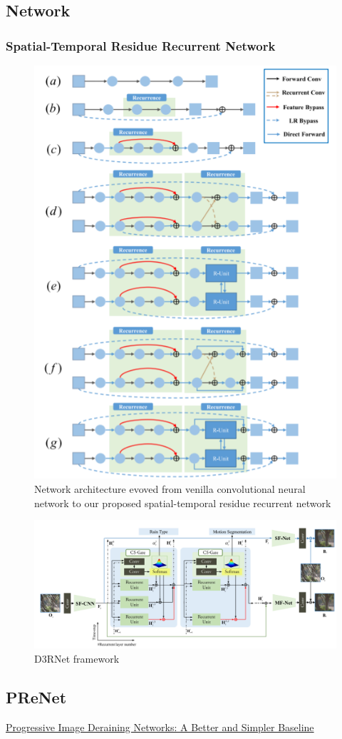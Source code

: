 \documentclass{article}
\begin{document}
\subsection{Network}
\subsubsection{Spatial-Temporal Residue Recurrent Network}
\begin{figure}[H]
\centering
\includegraphics[width=\linewidth]{D3RNET}
\caption{Network architecture evoved from venilla convolutional neural network to our proposed spatial-temporal residue recurrent network}
\end{figure}
\begin{figure}[H]
\centering
\includegraphics[width=\linewidth]{D3RNET2}
\caption{D3RNet framework}
\end{figure}
\subsection{PReNet}
\href{https://csdwren.github.io/papers/PReNet_cvpr_camera.pdf}{Progressive Image Deraining Networks: A Better and Simpler Baseline}
\end{document}
